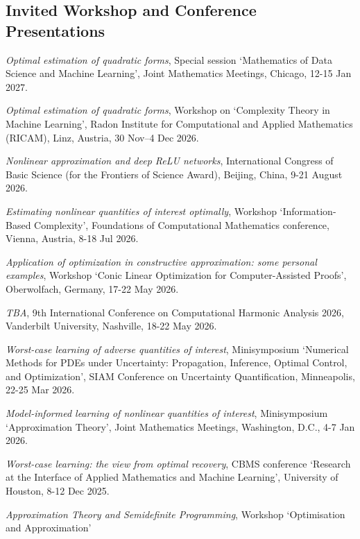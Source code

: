 \documentclass[11pt]{article}
\begin{document}
\subsection{Invited Workshop and Conference Presentations}
\bitemize 
\item {\sl Optimal estimation of quadratic forms}, 
Special session `Mathematics of Data Science and Machine Learning',
Joint Mathematics Meetings, Chicago,  12-15 Jan 2027.
\item {\sl  Optimal estimation of quadratic forms},
Workshop on `Complexity Theory in Machine Learning', 
Radon Institute for Computational and Applied
Mathematics (RICAM), Linz, Austria, 30 Nov--4 Dec 2026.
\item {\sl Nonlinear approximation and deep ReLU networks}, International Congress of Basic Science
(for the Frontiers of Science Award),
Beijing, China, 9-21 August 2026.
\item {\sl Estimating nonlinear quantities of interest optimally}, 
Workshop ‘Information-Based Complexity’, Foundations of Computational Mathematics conference, Vienna, Austria, 8-18 Jul 2026.
\item {\sl Application of optimization in constructive approximation: some personal examples},
Workshop `Conic Linear Optimization for Computer-Assisted Proofs', Oberwolfach, Germany, 17-22 May 2026.
\item {\sl TBA}, 
9th International Conference on Computational Harmonic Analysis 2026, Vanderbilt University, Nashville, 18-22 May 2026.
\item {\sl Worst-case learning of adverse quantities of interest}, Minisymposium `Numerical Methods for PDEs under Uncertainty: Propagation, Inference, Optimal Control, and Optimization',
SIAM Conference on Uncertainty Quantification,
Minneapolis, 22-25 Mar 2026.
\item {\sl Model-informed learning of nonlinear quantities of interest},
Minisymposium `Approximation Theory', Joint Mathematics Meetings, Washington, D.C., 4-7 Jan 2026. 
\item {\sl Worst-case learning: the view from optimal recovery},
CBMS conference `Research at the Interface of Applied Mathematics and Machine Learning',
University of Houston,
8-12 Dec 2025.
\item {\sl Approximation Theory and Semidefinite Programming}, Workshop `Optimisation and Approximation'
\end{document}

